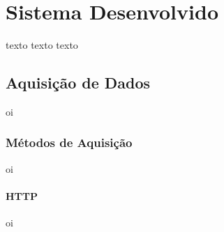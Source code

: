 \chapter{Sistema Desenvolvido}
\label{chap:sistema-desenvolvido}

texto texto texto

\section{Aquisição de Dados}
\label{sec:aquisicao-dados}

    oi
    
    \subsection{Métodos de Aquisição}
    \label{sec:metodos-aquisicao}
        oi
        
        \subsubsection{HTTP}
        \label{sec:aquisicao-http}
        oi
        
        \begin{figure}[!h]
    	\end{figure}
    	
